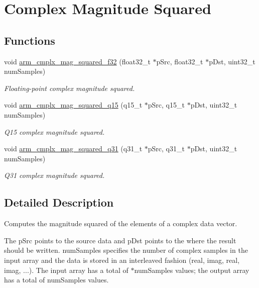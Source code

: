 \hypertarget{group__cmplx__mag__squared}{\section{Complex Magnitude Squared}
\label{group__cmplx__mag__squared}
}
\subsection*{Functions}
\begin{DoxyCompactItemize}
\item 
void \hyperlink{group__cmplx__mag__squared_gaa7faccc0d96b061d8b7d0d7d82045074}{arm\-\_\-cmplx\-\_\-mag\-\_\-squared\-\_\-f32} (float32\-\_\-t $\ast$p\-Src, float32\-\_\-t $\ast$p\-Dst, uint32\-\_\-t num\-Samples)
\begin{DoxyCompactList}\small\item\em Floating-\/point complex magnitude squared. \end{DoxyCompactList}\item 
void \hyperlink{group__cmplx__mag__squared_ga45537f576102d960d467eb722b8431f2}{arm\-\_\-cmplx\-\_\-mag\-\_\-squared\-\_\-q15} (q15\-\_\-t $\ast$p\-Src, q15\-\_\-t $\ast$p\-Dst, uint32\-\_\-t num\-Samples)
\begin{DoxyCompactList}\small\item\em Q15 complex magnitude squared. \end{DoxyCompactList}\item 
void \hyperlink{group__cmplx__mag__squared_ga384b0538101e8c03fa4fa14271e63b04}{arm\-\_\-cmplx\-\_\-mag\-\_\-squared\-\_\-q31} (q31\-\_\-t $\ast$p\-Src, q31\-\_\-t $\ast$p\-Dst, uint32\-\_\-t num\-Samples)
\begin{DoxyCompactList}\small\item\em Q31 complex magnitude squared. \end{DoxyCompactList}\end{DoxyCompactItemize}


\subsection{Detailed Description}
Computes the magnitude squared of the elements of a complex data vector.

The {\ttfamily p\-Src} points to the source data and {\ttfamily p\-Dst} points to the where the result should be written. {\ttfamily num\-Samples} specifies the number of complex samples in the input array and the data is stored in an interleaved fashion (real, imag, real, imag, ...). The input array has a total of {$\ast$num\-Samples} values; the output array has a total of {\ttfamily num\-Samples} values.

